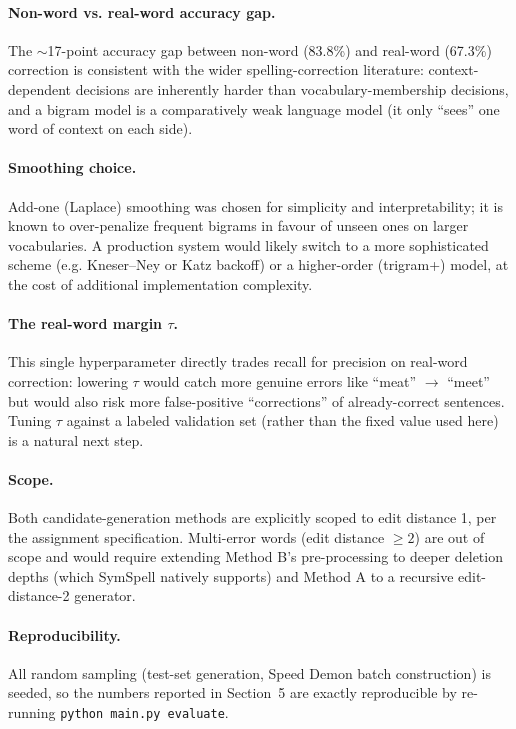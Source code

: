 \documentclass[11pt]{article}
\begin{document}
\paragraph{Non-word vs. real-word accuracy gap.} The $\sim$17-point accuracy gap between non-word (83.8\%) and real-word (67.3\%) correction is consistent with the wider spelling-correction literature: context-dependent decisions are inherently harder than vocabulary-membership decisions, and a bigram model is a comparatively weak language model (it only ``sees'' one word of context on each side).

\paragraph{Smoothing choice.} Add-one (Laplace) smoothing was chosen for simplicity and interpretability; it is known to over-penalize frequent bigrams in favour of unseen ones on larger vocabularies. A production system would likely switch to a more sophisticated scheme (e.g. Kneser--Ney or Katz backoff) or a higher-order (trigram+) model, at the cost of additional implementation complexity.

\paragraph{The real-word margin $\tau$.} This single hyperparameter directly trades recall for precision on real-word correction: lowering $\tau$ would catch more genuine errors like ``meat'' $\rightarrow$ ``meet'' but would also risk more false-positive ``corrections'' of already-correct sentences. Tuning $\tau$ against a labeled validation set (rather than the fixed value used here) is a natural next step.

\paragraph{Scope.} Both candidate-generation methods are explicitly scoped to edit distance 1, per the assignment specification. Multi-error words (edit distance $\geq 2$) are out of scope and would require extending Method B's pre-processing to deeper deletion depths (which SymSpell natively supports) and Method A to a recursive edit-distance-2 generator.

\paragraph{Reproducibility.} All random sampling (test-set generation, Speed Demon batch construction) is seeded, so the numbers reported in Section~5 are exactly reproducible by re-running \texttt{python main.py evaluate}.
\end{document}
